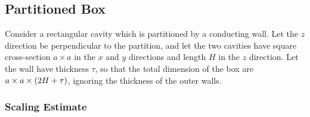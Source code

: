 \documentclass[prd,longbibliography,nofootinbib]{revtex4-2}
\begin{document}
\subsection{Partitioned Box}

Consider a rectangular cavity which is partitioned by a conducting wall. 
Let the $z$ direction be perpendicular to the partition, and let the two cavities have square cross-section $a \times a$ in the $x$ and $y$ directions and length $H$ in the $z$ direction. 
Let the wall have thickness $\tau$, so that the total dimension of the box are $a \times a \times \left( 2 H + \tau \right)$, ignoring the thickness of the outer walls. 

\subsubsection{Scaling Estimate}
\end{document}
